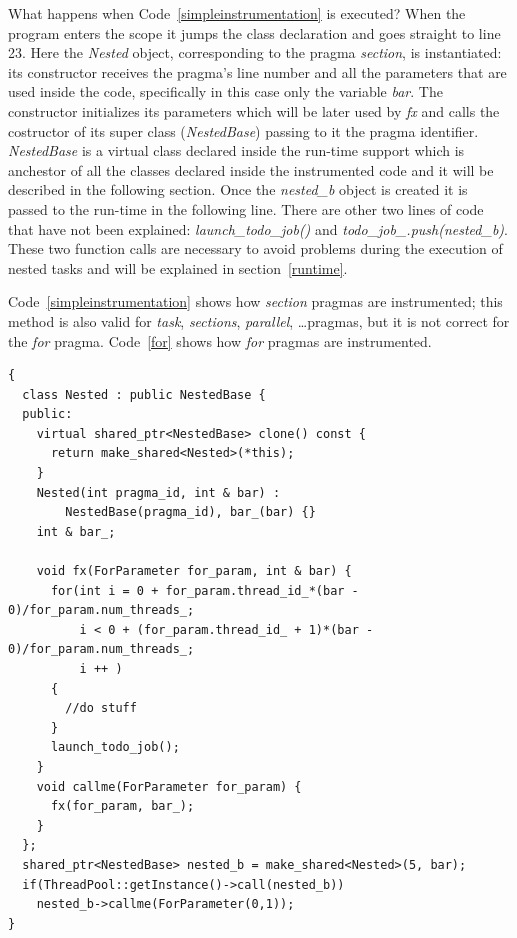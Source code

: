 \documentclass[a4paper,12pt,oneside]{book}
\begin{document}
What happens when Code~\ref{simpleinstrumentation} is executed? When the program enters the scope it jumps the class declaration and goes straight to line 23. Here the \emph{Nested} object, corresponding to the pragma \emph{section}, is instantiated: its constructor receives the pragma’s line number and all the parameters that are used inside the code, specifically in this case only the variable \emph{bar}. The constructor initializes its parameters which will be later used by \emph{fx} and calls the costructor of its super class (\emph{NestedBase}) passing to it the pragma identifier.  \emph{NestedBase} is a virtual class declared inside the run-time support which is anchestor of all the classes declared inside the instrumented code and it will be described in the following section. Once the \emph{nested\_b} object is created it is passed to the run-time in the following line. There are other two lines of code that have not been explained: \emph{launch\_todo\_job()} and \emph{todo\_job\_.push(nested\_b)}. These two function calls are necessary to avoid problems during the execution of nested tasks and will be explained in section~\ref{runtime}.

Code~\ref{simpleinstrumentation} shows how \emph{section} pragmas are instrumented; this method is also valid for \emph{task}, \emph{sections}, \emph{parallel}, \dots pragmas, but it is not correct for the \emph{for} pragma. Code~\ref{for} shows how \emph{for} pragmas are instrumented.

\begin{lstlisting}[language=CCC, caption=Example of an instrumented \emph{for} pragma from Code~\ref{code}., label=for]
{
  class Nested : public NestedBase {
  public: 
    virtual shared_ptr<NestedBase> clone() const { 
      return make_shared<Nested>(*this);
    } 
    Nested(int pragma_id, int & bar) : 
        NestedBase(pragma_id), bar_(bar) {}
    int & bar_;

    void fx(ForParameter for_param, int & bar) {
      for(int i = 0 + for_param.thread_id_*(bar - 0)/for_param.num_threads_; 
          i < 0 + (for_param.thread_id_ + 1)*(bar - 0)/for_param.num_threads_; 
          i ++ )
      {
        //do stuff
      }  
      launch_todo_job(); 
    }
    void callme(ForParameter for_param) {
      fx(for_param, bar_);
    }
  };
  shared_ptr<NestedBase> nested_b = make_shared<Nested>(5, bar);
  if(ThreadPool::getInstance()->call(nested_b)) 
    nested_b->callme(ForParameter(0,1));
}
\end{lstlisting}
\end{document}
